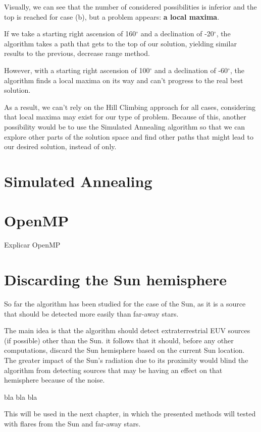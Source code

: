 Visually, we can see that the number of considered possibilities is inferior and the top is reached for case (b), but a problem appears: \textbf{a local maxima}.

If we take a starting right ascension of 160$^{\circ}$ and a declination of -20$^{\circ}$, the algorithm takes a path that gets to the top of our solution, yielding similar results to the previous, decrease range method.

However, with a starting right ascension of 100$^{\circ}$ and a declination of -60$^{\circ}$, the algorithm finds a local maxima on its way and can't progress to the real best solution.

As a result, we can't rely on the Hill Climbing approach for all cases, considering that local maxima may exist for our type of problem. Because of this, another possibility would be to use the Simulated Annealing algorithm so that we can explore other parts of the solution space and find other paths that might lead to our desired solution, instead of only.

\section{Simulated Annealing}

\section{OpenMP}

Explicar OpenMP

\section{Discarding the Sun hemisphere}

So far the algorithm has been studied for the case of the Sun, as it is a source that should be detected more easily than far-away stars. 

The main idea is that the algorithm should detect extraterrestrial EUV sources (if possible) other than the Sun. it follows that it should, before any other computations, discard the Sun hemisphere based on the current Sun location. The greater impact of the Sun's radiation due to its proximity would blind the algorithm from detecting sources that may be having an effect on that hemisphere because of the noise.


bla bla bla

This will be used in the next chapter, in which the presented methods will tested with flares from the Sun and far-away stars.
